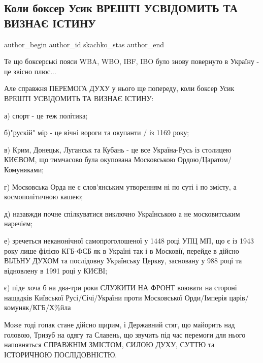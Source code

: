  
 
 
 
 
 
\subsection{Коли боксер Усик ВРЕШТІ УСВІДОМИТЬ ТА ВИЗНАЄ ІСТИНУ}
\label{sec:26_09_2021.fb.skachko_stas.1.usik_istina}
 
\ifcmt
 author_begin
   author_id skachko_stas
 author_end
\fi

Те що боксерські пояси WBA, WBO, IBF, IBO було знову повернуто в Україну - це
звісно плюс...

Але справжня ПЕРЕМОГА ДУХУ у нього ще попереду, коли боксер Усик ВРЕШТІ
УСВІДОМИТЬ ТА ВИЗНАЄ ІСТИНУ:

а) спорт - це теж політика; 

б)"рускій" мір - це вічні вороги та окупанти / із 1169 року; 

в) Крим, Донецьк, Луганськ та Кубань - це все Україна-Русь із столицею КИЄВОМ,
що тимчасово була окупована Московською Ордою/Царатом/Комуняками;  

г) Московська Орда не є слов'янським утворенням ні по суті і по змісту, а
космополітичною кашею; 

д) назавжди почне спілкуватися виключно Українською а не московитським
наречієм; 

е) зречеться неканонічної самопроголошеної у 1448 році УПЦ МП, що є із 1943
року лише філією КГБ-ФСБ як в Україні так і в Московії, перейде в дійсно ВІЛЬНУ
ДУХОМ та послідовну Українську Церкву, засновану у 988 році та відновлену в
1991 році у КИЄВІ; 

є) піде хоча б на два-три роки СЛУЖИТИ НА ФРОНТ воювати на стороні нащадків
Київської Русі/Січі/України проти Московської Орди/Імперія
царів/комуняк/КГБ/Х\%йла

Може тоді гопак стане дійсно щирим, і Державний стяг, що майорить над головою,
Тризуб на одягу та Славень, що звучить під час перемоги для нього наповняться
СПРАВЖНІМ ЗМІСТОМ, СИЛОЮ ДУХУ, СУТТЮ та ІСТОРИЧНОЮ ПОСЛІДОВНІСТЮ.

